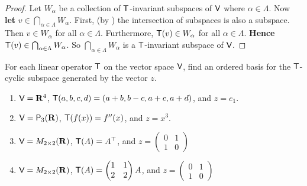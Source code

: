 \begin{proof}
Let \(W_{\alpha}\) be a collection of \(\textsf{T}\)-invariant subspaces of \(\textsf{V}\) where \(\alpha \in \Lambda\).
Now \textbf{let} \(v \in \bigcap_{\alpha \in \Lambda} W_{\alpha}\).
First, (by ) the intersection of subspaces is also a subspace.
Then \(v \in W_{\alpha}\) for all \(\alpha \in \Lambda\).
Furthermore, \(\textsf{T}(v) \in W_{\alpha}\) for all \(\alpha \in \Lambda\).
\textbf{Hence} \(\textsf{T}(v) \in \bigcap_{\alpha \in \Lambda} W_{\alpha}\).
So \(\bigcap_{\alpha \in \Lambda} W_{\alpha}\) is a \(\textsf{T}\)-invariant subspace of \(\textsf{V}\).
\end{proof}

\begin{exercise} \label{exercise 5.4.6}
For each linear operator \(\textsf{T}\) on the vector space \(\textsf{V}\), find an ordered basis for the \(\textsf{T}\)-cyclic subspace generated by the vector \(z\).
\begin{enumerate}
\item \(\textsf{V} = \mathbf{R}^4\), \(\textsf{T}(a, b, c, d) = (a + b, b - c, a + c, a + d)\), and \(z = e_1\).
\item \(\textsf{V} = \textsf{P}_3(\mathbf{R})\), \(\textsf{T}(f(x)) = f''(x)\), and \(z = x^3\).
\item \(\textsf{V} = M_{2 \times 2}(\mathbf{R})\), \(\textsf{T}(A) = A^\top\), and \(z = \begin{pmatrix} 0 & 1 \\ 1 & 0 \end{pmatrix}\)
\item \(\textsf{V} = M_{2 \times 2}(\mathbf{R})\), \(\textsf{T}(A) = \begin{pmatrix} 1 & 1 \\ 2 & 2 \end{pmatrix} A\), and \(z = \begin{pmatrix} 0 & 1 \\ 1 & 0 \end{pmatrix}\)
\end{enumerate}
\end{exercise}

